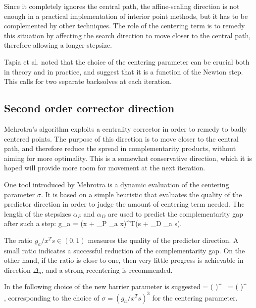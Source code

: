 Since it completely ignores the central path, the affine-scaling 
direction is not enough in a practical implementation of 
interior point methods, but it has to be 
complemented by other techniques.
The role of the centering term is to remedy this situation by 
affecting the search direction to move closer to the central path, 
therefore allowing a longer stepsize. 

Tapia et al. \cite{TapiaZhangSaltzmanWeiser} noted that the choice of the 
centering parameter can be crucial both in theory and in practice,
and suggest that it is a function of the Newton step. 
This calls for two separate backsolves at each iteration.


%
%
\subsection{Second order corrector direction}

Mehrotra's algorithm exploits a centrality corrector in order to 
remedy to badly centered points. The purpose of this direction is 
to move closer to the central path, and therefore reduce the spread 
in complementarity products, without aiming for more optimality. 
This is a somewhat conservative direction, which it is hoped will 
provide more room for movement at the next iteration.

One tool introduced by Mehrotra \cite{Mehrotra92} is a dynamic evaluation 
of the centering parameter $\sigma$. It is based on a simple  
heuristic that evaluates the quality of the predictor direction
in order to judge the amount of centering term needed.
%
The length of the stepsizes $\alpha_P$ and $\alpha_D$ are used to 
predict the complementarity gap after such a step:
\be \label{eq:PredictedGap}
  g_a = (x + \alpha_P \Delta_a x)^T(s + \alpha_D \Delta_a s).
\ee

The ratio $g_a / x^{T}s \in (0,1)$ measures the quality of the 
predictor direction.
A small ratio indicates a successful reduction of the complementarity 
gap. On the other hand, if the ratio is close to one, then very little 
progress is achievable in direction $\Delta_a$, and a strong recentering 
is recommended.

In \cite{Mehrotra92} the following choice of the new barrier parameter 
is suggested
%
\be \label{eq:Mu}
  \mu = \left(  \right)^{} \, 
           = \left(  \right)^{} \, ,
\ee
%
corresponding to the choice of $\sigma = (g_a / x^Ts)^3$ 
for the centering parameter. 

